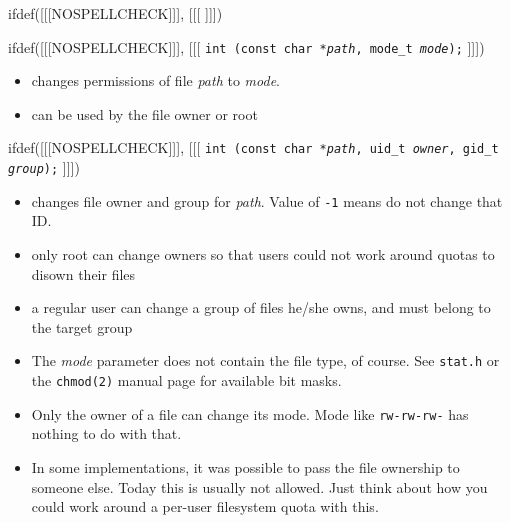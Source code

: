 
ifdef([[[NOSPELLCHECK]]], [[[
]]])

\begin{slide}
ifdef([[[NOSPELLCHECK]]], [[[
\texttt{int (const char *\emph{path}, mode\_t \emph{mode});}
]]])
\begin{itemize}
\item changes permissions of file \emph{path} to \emph{mode}.
\item can be used by the file owner or root
\end{itemize}
ifdef([[[NOSPELLCHECK]]], [[[
\texttt{int (const char *\emph{path}, uid\_t \emph{owner},
gid\_t \emph{group});}
]]])
\begin{itemize}
\item changes file owner and group for \emph{path}.  Value of
\texttt{-1} means do not change that ID.
\item only root can change owners so that users could not work around quotas
to disown their files
\item a regular user can change a group of files he/she owns, and must belong to
the target group
\end{itemize}
\end{slide}

\begin{itemize}
\item The \emph{mode} parameter does not contain the file type, of course.  See
\texttt{stat.h} or the \texttt{chmod(2)} manual page for available bit
masks.
\item Only the owner of a file can change its mode.  Mode like
\texttt{rw-rw-rw-} has nothing to do with that.
\item In some implementations, it was possible to pass the file ownership to
someone else.  Today this is usually not allowed.  Just think about how you
could work around a per-user filesystem quota with this.
\end{itemize}

\endinput
